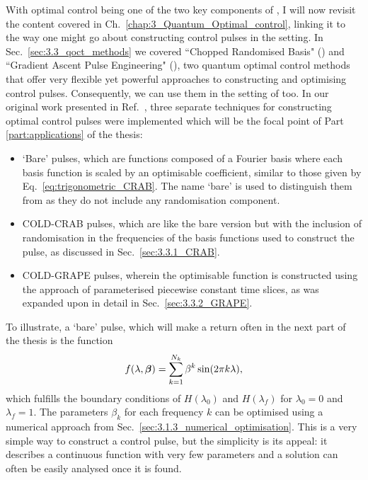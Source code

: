 With optimal control being one of the two key components of , I will now revisit the content covered in Ch.~\ref{chap:3_Quantum_Optimal_control}, linking it to the way one might go about constructing control pulses in the  setting. In Sec.~\ref{sec:3.3_qoct_methods} we covered ``Chopped Randomised Basis" () and ``Gradient Ascent Pulse Engineering" (), two quantum optimal control methods that offer very flexible yet powerful approaches to constructing and optimising control pulses. Consequently, we can use them in the setting of  too. In our original work presented in Ref.~\cite{cepaite_counterdiabatic_2023}, three separate techniques for constructing optimal control pulses were implemented which will be the focal point of Part \ref{part:applications} of the thesis:
\begin{itemize}
    \item `Bare' pulses, which are functions composed of a Fourier basis where each basis function is scaled by an optimisable coefficient, similar to those given by Eq.~\ref{eq:trigonometric_CRAB}. The name `bare' is used to distinguish them from  as they do not include any randomisation component.
    \item COLD-CRAB pulses, which are like the bare version but with the inclusion of randomisation in the frequencies of the basis functions used to construct the pulse, as discussed in Sec.~\ref{sec:3.3.1_CRAB}.
    \item COLD-GRAPE pulses, wherein the optimisable function is constructed using the  approach of parameterised piecewise constant time slices, as was expanded upon in detail in Sec.~\ref{sec:3.3.2_GRAPE}. 
\end{itemize}

To illustrate, a `bare' pulse, which will make a return often in the next part of the thesis is the function
\begin{equation}\label{eq:bare_pulse}
    f(\lambda, \boldsymbol{\beta}) = \sum_{k=1}^{N_k} \beta^k \sin (2 \pi k \lambda),
\end{equation}
which fulfills the boundary conditions of $H(\lambda_0)$ and $H(\lambda_f)$ for $\lambda_0 = 0$ and $\lambda_f = 1$. The parameters $\beta_k$ for each frequency $k$ can be optimised using a numerical approach from Sec.~\ref{sec:3.1.3_numerical_optimisation}. This is a very simple way to construct a control pulse, but the simplicity is its appeal: it describes a continuous function with very few parameters and a solution can often be easily analysed once it is found.

